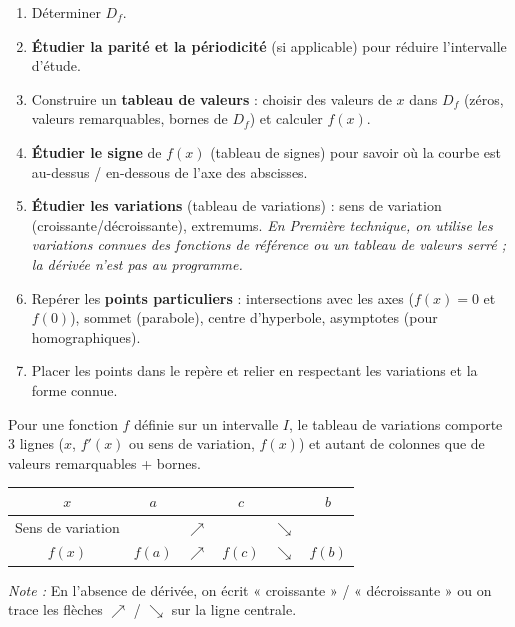 \documentclass[11pt]{article}
\begin{document}
\begin{methode}
\begin{enumerate}
\item Déterminer $D_f$.
\item \textbf{Étudier la parité et la périodicité} (si applicable) pour réduire l'intervalle d'étude.
\item Construire un \textbf{tableau de valeurs} : choisir des valeurs de $x$ dans $D_f$ (zéros, valeurs remarquables, bornes de $D_f$) et calculer $f(x)$.
\item \textbf{Étudier le signe} de $f(x)$ (tableau de signes) pour savoir où la courbe est au-dessus / en-dessous de l'axe des abscisses.
\item \textbf{Étudier les variations} (tableau de variations) : sens de variation (croissante/décroissante), extremums. \emph{En Première technique, on utilise les variations connues des fonctions de référence ou un tableau de valeurs serré ; la dérivée n'est pas au programme.}
\item Repérer les \textbf{points particuliers} : intersections avec les axes ($f(x)=0$ et $f(0)$), sommet (parabole), centre d'hyperbole, asymptotes (pour homographiques).
\item Placer les points dans le repère et relier en respectant les variations et la forme connue.
\end{enumerate}
\end{methode}

\begin{propriete}
Pour une fonction $f$ définie sur un intervalle $I$, le tableau de variations comporte 3 lignes ($x$, $f'(x)$ ou sens de variation, $f(x)$) et autant de colonnes que de valeurs remarquables + bornes.
\begin{center}
\begin{tabular}{|c|ccccc|}\hline
$x$ & $a$ & & $c$ & & $b$ \\ \hline
Sens de variation & & $\nearrow$ & & $\searrow$ & \\ \hline
$f(x)$ & $f(a)$ & $\nearrow$ & $f(c)$ & $\searrow$ & $f(b)$ \\ \hline
\end{tabular}
\end{center}
\emph{Note :} En l'absence de dérivée, on écrit « croissante » / « décroissante » ou on trace les flèches $\nearrow$ / $\searrow$ sur la ligne centrale.
\end{propriete}
\end{document}

